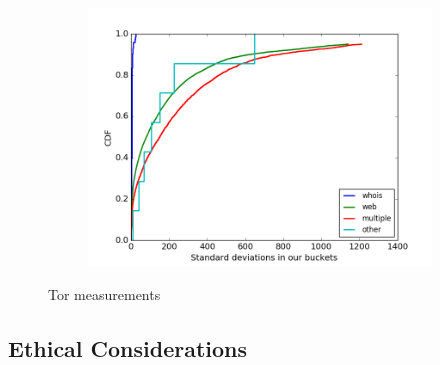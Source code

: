 \begin{figure}
\begin{subfigure}[t]{0.32\textwidth}
		\includegraphics[scale=0.28]{images/stddevs.png}
		\label{fig:stats_c}
	\end{subfigure}
	\label{fig:measurements}
	\caption{Tor measurements}
\end{figure}
\subsection{Ethical Considerations}
